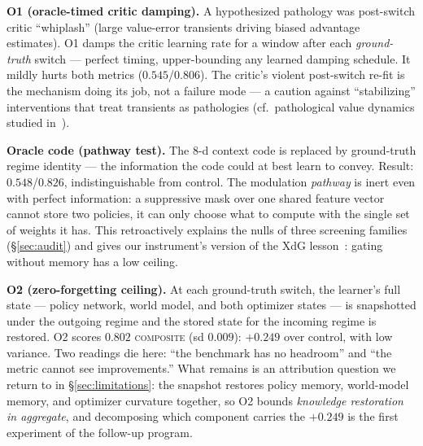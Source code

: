 \documentclass[11pt]{article}
\newcommand{\composite}{\textsc{composite}}
\begin{document}
\textbf{O1 (oracle-timed critic damping).} A hypothesized pathology was
post-switch critic ``whiplash'' (large value-error transients driving biased
advantage estimates). O1 damps the critic learning rate for a window after
each \emph{ground-truth} switch --- perfect timing, upper-bounding any learned
damping schedule. It mildly hurts both metrics ($0.545$/$0.806$). The critic's
violent post-switch re-fit is the mechanism doing its job, not a failure mode
--- a caution against ``stabilizing'' interventions that treat transients as
pathologies (cf.\ pathological value dynamics studied
in~\citep{kumar2021implicit,lyle2022capacity}).

\textbf{Oracle code (pathway test).} The 8-d context code is replaced by
ground-truth regime identity --- the information the code could at best learn
to convey. Result: $0.548$/$0.826$, indistinguishable from control. The
modulation \emph{pathway} is inert even with perfect information: a
suppressive mask over one shared feature vector cannot store two policies, it
can only choose what to compute with the single set of weights it has. This
retroactively explains the nulls of three screening families
(\S\ref{sec:audit}) and gives our instrument's version of the XdG
lesson~\citep{masse2018xdg}: gating without memory has a low ceiling.

\textbf{O2 (zero-forgetting ceiling).} At each ground-truth switch, the
learner's full state --- policy network, world model, and both optimizer
states --- is snapshotted under the outgoing regime and the stored state for
the incoming regime is restored. O2 scores $\mathbf{0.802}$ \composite{}
(sd $0.009$): $+0.249$ over control, with low variance. Two readings die
here: ``the benchmark has no headroom'' and ``the metric cannot see
improvements.'' What remains is an attribution question we return to in
\S\ref{sec:limitations}: the snapshot restores policy memory, world-model
memory, and optimizer curvature together, so O2 bounds \emph{knowledge
restoration in aggregate}, and decomposing which component carries the
$+0.249$ is the first experiment of the follow-up program.
\end{document}
